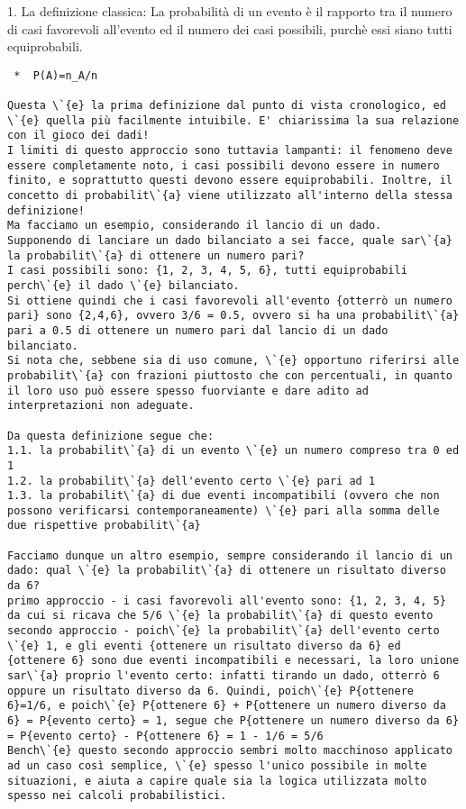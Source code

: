 \documentclass{book}
\begin{document}
1. La definizione classica:
La probabilit\`{a} di un evento \`{e} il rapporto tra il numero di casi favorevoli all'evento ed il numero dei casi possibili, purch\`{e} essi siano tutti equiprobabili.

\begin{verbatim}
 *	P(A)=n_A/n

Questa \`{e} la prima definizione dal punto di vista cronologico, ed \`{e} quella più facilmente intuibile. E' chiarissima la sua relazione con il gioco dei dadi!
I limiti di questo approccio sono tuttavia lampanti: il fenomeno deve essere completamente noto, i casi possibili devono essere in numero finito, e soprattutto questi devono essere equiprobabili. Inoltre, il concetto di probabilit\`{a} viene utilizzato all'interno della stessa definizione!
Ma facciamo un esempio, considerando il lancio di un dado.
Supponendo di lanciare un dado bilanciato a sei facce, quale sar\`{a} la probabilit\`{a} di ottenere un numero pari?
I casi possibili sono: {1, 2, 3, 4, 5, 6}, tutti equiprobabili perch\`{e} il dado \`{e} bilanciato.
Si ottiene quindi che i casi favorevoli all'evento {otterrò un numero pari} sono {2,4,6}, ovvero 3/6 = 0.5, ovvero si ha una probabilit\`{a} pari a 0.5 di ottenere un numero pari dal lancio di un dado bilanciato.
Si nota che, sebbene sia di uso comune, \`{e} opportuno riferirsi alle probabilit\`{a} con frazioni piuttosto che con percentuali, in quanto il loro uso può essere spesso fuorviante e dare adito ad interpretazioni non adeguate.

Da questa definizione segue che:
1.1. la probabilit\`{a} di un evento \`{e} un numero compreso tra 0 ed 1
1.2. la probabilit\`{a} dell'evento certo \`{e} pari ad 1
1.3. la probabilit\`{a} di due eventi incompatibili (ovvero che non possono verificarsi contemporaneamente) \`{e} pari alla somma delle due rispettive probabilit\`{a}

Facciamo dunque un altro esempio, sempre considerando il lancio di un dado: qual \`{e} la probabilit\`{a} di ottenere un risultato diverso da 6?
primo approccio - i casi favorevoli all'evento sono: {1, 2, 3, 4, 5} da cui si ricava che 5/6 \`{e} la probabilit\`{a} di questo evento
secondo approccio - poich\`{e} la probabilit\`{a} dell'evento certo \`{e} 1, e gli eventi {ottenere un risultato diverso da 6} ed {ottenere 6} sono due eventi incompatibili e necessari, la loro unione sar\`{a} proprio l'evento certo: infatti tirando un dado, otterrò 6 oppure un risultato diverso da 6. Quindi, poich\`{e} P{ottenere 6}=1/6, e poich\`{e} P{ottenere 6} + P{ottenere un numero diverso da 6} = P{evento certo} = 1, segue che P{ottenere un numero diverso da 6} = P{evento certo} - P{ottenere 6} = 1 - 1/6 = 5/6
Bench\`{e} questo secondo approccio sembri molto macchinoso applicato ad un caso così semplice, \`{e} spesso l'unico possibile in molte situazioni, e aiuta a capire quale sia la logica utilizzata molto spesso nei calcoli probabilistici.


\end{verbatim}
\end{document}
